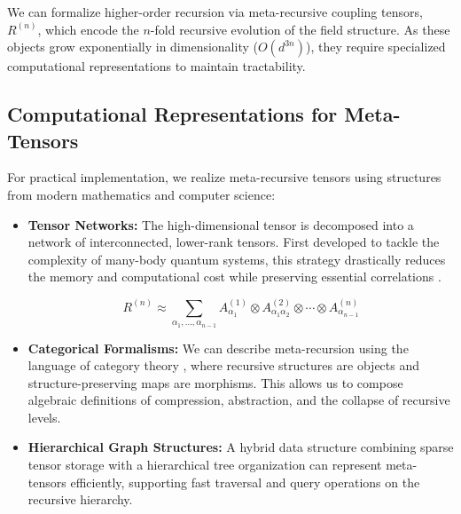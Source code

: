 We can formalize higher-order recursion via meta-recursive coupling tensors, \(R^{(n)}\), which encode the \(n\)-fold recursive evolution of the field structure. As these objects grow exponentially in dimensionality (\(O(d^{3n})\)), they require specialized computational representations to maintain tractability.


\subsection{Computational Representations for Meta-Tensors}
\label{17.4.2:computational_representations_for_meta_tensors}

For practical implementation, we realize meta-recursive tensors using structures from modern mathematics and computer science:

\begin{itemize}

    \item \textbf{Tensor Networks:} The high-dimensional tensor is decomposed into a network of interconnected, lower-rank tensors. First developed to tackle the complexity of many-body quantum systems, this strategy drastically reduces the memory and computational cost while preserving essential correlations \autocite{Orus2014}.
    
    \begin{equation}
    R^{(n)} \approx \sum_{\alpha_1, \ldots, \alpha_{n-1}} A^{(1)}_{\alpha_1} \otimes A^{(2)}_{\alpha_1 \alpha_2} \otimes \cdots \otimes A^{(n)}_{\alpha_{n-1}}
    \end{equation}

    \item \textbf{Categorical Formalisms:} We can describe meta-recursion using the language of category theory \autocite{MacLane1998}, where recursive structures are objects and structure-preserving maps are morphisms. This allows us to compose algebraic definitions of compression, abstraction, and the collapse of recursive levels.
    
    \item \textbf{Hierarchical Graph Structures:} A hybrid data structure combining sparse tensor storage with a hierarchical tree organization can represent meta-tensors efficiently, supporting fast traversal and query operations on the recursive hierarchy.

\end{itemize}

